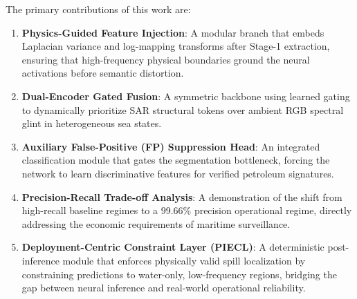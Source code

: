 The primary contributions of this work are:
\begin{enumerate}
    \item \textbf{Physics-Guided Feature Injection}: A modular branch that embeds Laplacian variance and log-mapping transforms after Stage-1 extraction, ensuring that high-frequency physical boundaries ground the neural activations before semantic distortion.
    \item \textbf{Dual-Encoder Gated Fusion}: A symmetric backbone using learned gating to dynamically prioritize SAR structural tokens over ambient RGB spectral glint in heterogeneous sea states.
    \item \textbf{Auxiliary False-Positive (FP) Suppression Head}: An integrated classification module that gates the segmentation bottleneck, forcing the network to learn discriminative features for verified petroleum signatures.
    \item \textbf{Precision-Recall Trade-off Analysis}: A demonstration of the shift from high-recall baseline regimes to a 99.66\% precision operational regime, directly addressing the economic requirements of maritime surveillance.
    \item \textbf{Deployment-Centric Constraint Layer (PIECL)}: A deterministic post-inference module that enforces physically valid spill localization by constraining predictions to water-only, low-frequency regions, bridging the gap between neural inference and real-world operational reliability.
\end{enumerate}
